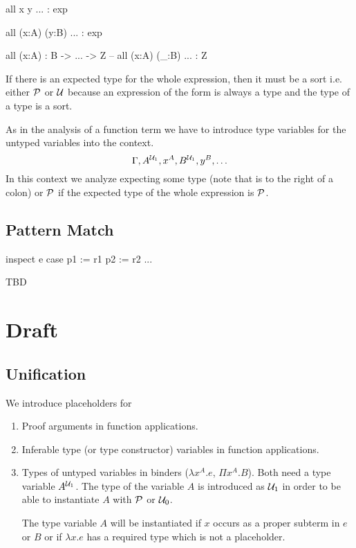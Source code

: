 \begin{alba}
  all x y ... : exp

  all (x:A) (y:B) ... : exp

  all (x:A) : B -> ... -> Z        -- all (x:A) (_:B) ... : Z
\end{alba}

If there is an expected type for the whole expression, then it must be a sort
i.e. either ${\cal{P}}$ or ${\cal{U}}$ because an expression of the form  is always a type and the type of a type is a sort.

As in the analysis of a function term we have to introduce type variables for
the untyped variables into the context.
$$
\Gamma, A^{{\cal{U}}_1}, x^A, B^{{\cal{U}}_1}, y^B, \ldots
$$
%
In this context we analyze  expecting some type (note that
 is to the right of a colon) or ${\cal{P}}$ if the expected type of the
whole expression is ${\cal{P}}$.





\vskip 5mm

\subsection{Pattern Match}

\begin{alba}
  inspect
    e
  case
    p1 := r1
    p2 := r2
    ...
\end{alba}


\vskip 5mm
TBD
\vskip 5mm




\newpage
\section{Draft}

\subsection{Unification}

We introduce placeholders for

\begin{enumerate}

\item Proof arguments in function applications.

\item Inferable type (or type constructor) variables in function applications.

\item Types of untyped variables in binders ($\lambda x^A . e$, $\Pi x^A
  . B$). Both need a type variable $A^{{\cal{U}}_1}$. The type of the variable $A$
  is introduced as ${\cal{U}}_1$ in order to be able to instantiate $A$ with
  ${\cal{P}}$ or ${\cal{U}}_0$.

  The type variable $A$ will be instantiated if $x$ occurs as a proper subterm
  in $e$ or $B$ or if $\lambda x . e$ has a required type which is not a
  placeholder.

\end{enumerate}



